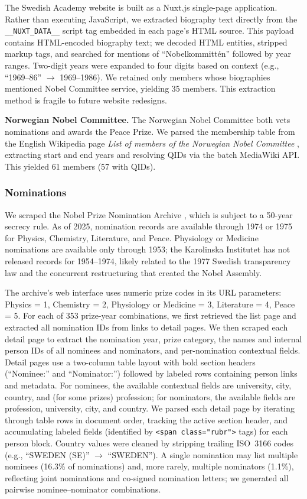 \documentclass[11pt]{article}
\begin{document}
The Swedish Academy website is built as a Nuxt.js single-page application. Rather than executing JavaScript, we extracted biography text directly from the \texttt{\_\_NUXT\_DATA\_\_} script tag embedded in each page's HTML source. This payload contains HTML-encoded biography text; we decoded HTML entities, stripped markup tags, and searched for mentions of ``Nobelkommitt\'en'' followed by year ranges. Two-digit years were expanded to four digits based on context (e.g., ``1969--86'' $\to$ 1969--1986). We retained only members whose biographies mentioned Nobel Committee service, yielding 35 members. This extraction method is fragile to future website redesigns.

\textbf{Norwegian Nobel Committee.} The Norwegian Nobel Committee both vets nominations and awards the Peace Prize. We parsed the membership table from the English Wikipedia page \emph{List of members of the Norwegian Nobel Committee} \citep{NorwegianNobelCommittee}, extracting start and end years and resolving QIDs via the batch MediaWiki API. This yielded 61 members (57 with QIDs).

\subsubsection{Nominations}
\label{sec:data-nominations}

We scraped the Nobel Prize Nomination Archive \citep{NobelPrizeWebsite}, which is subject to a 50-year secrecy rule. As of 2025, nomination records are available through 1974 or 1975 for Physics, Chemistry, Literature, and Peace. Physiology or Medicine nominations are available only through 1953; the Karolinska Institutet has not released records for 1954--1974, likely related to the 1977 Swedish transparency law and the concurrent restructuring that created the Nobel Assembly.

The archive's web interface uses numeric prize codes in its URL parameters: Physics = 1, Chemistry = 2, Physiology or Medicine = 3, Literature = 4, Peace = 5. For each of 353 prize-year combinations, we first retrieved the list page and extracted all nomination IDs from links to detail pages. We then scraped each detail page to extract the nomination year, prize category, the names and internal person IDs of all nominees and nominators, and per-nomination contextual fields. Detail pages use a two-column table layout with bold section headers (``Nominee:'' and ``Nominator:'') followed by labeled rows containing person links and metadata. For nominees, the available contextual fields are university, city, country, and (for some prizes) profession; for nominators, the available fields are profession, university, city, and country. We parsed each detail page by iterating through table rows in document order, tracking the active section header, and accumulating labeled fields (identified by \texttt{<span class="rubr">} tags) for each person block. Country values were cleaned by stripping trailing ISO~3166 codes (e.g., ``SWEDEN (SE)'' $\to$ ``SWEDEN''). A single nomination may list multiple nominees (16.3\% of nominations) and, more rarely, multiple nominators (1.1\%), reflecting joint nominations and co-signed nomination letters; we generated all pairwise nominee--nominator combinations.
\end{document}
